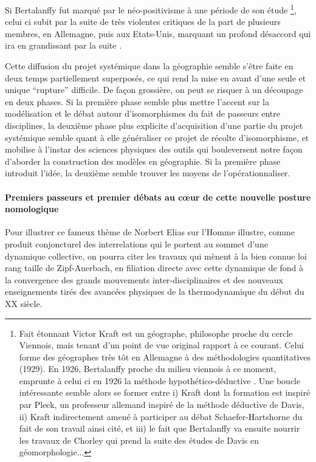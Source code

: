 Si Bertalanffy fut marqué par le néo-positivisme à une période de son étude \footnote{Fait étonnant Victor Kraft est un géographe, philosophe proche du cercle Viennois, mais tenant d'un point de vue original rapport à ce courant. Celui forme des géographes très tôt en Allemagne à des méthodologies quantitatives (1929). En 1926, Bertalanffy proche du milieu viennois à ce moment, emprunte à celui ci en 1926 la méthode hypothético-déductive \autocite[342]{Pouvreau2013}. Une boucle intéressante semble alors se former entre i) Kraft dont la formation est inspiré par Pleck, un professeur allemand inspiré de la méthode déductive de Davis, ii) Kraft indirectement amené à participer au débat Schaefer-Hartshorne du fait de son travail ainsi cité, et iii) le fait que Bertalanffy va ensuite nourrir les travaux de Chorley qui prend la suite des études de Davis en géomorphologie...}, celui ci subit par la suite de très violentes critiques de la part de plusieurs membres, en Allemagne, puis aux Etats-Unis, marquant un profond désaccord qui ira en grandissant par la suite \autocite[26-27]{Pouvreau2006}.

Cette diffusion du projet systémique dans la géographie semble s'être faite en deux temps partiellement superposés, ce qui rend la mise en avant d'une seule et unique \enquote{rupture} difficile. De façon grossière, on peut se risquer à un découpage en deux phases. Si la première phase semble plus mettre l'accent sur la modélisation et le débat autour d'isomorphismes du fait de passeurs entre disciplines, la deuxième phase plus explicite d'acquisition d'une partie du projet systémique semble quant à elle généraliser ce projet de récolte d'isomorphisme, et mobilise à l'instar des sciences physiques des outils qui bouleversent notre façon d'aborder la construction des modèles en géographie. Si la première phase introduit l'idée, la deuxième semble trouver les moyens de l’opérationnaliser.

\paragraph{Premiers passeurs et premier débats au cœur de cette nouvelle posture nomologique}

Pour illustrer ce fameux thème de Norbert Elias \autocite[31-33]{Delmotte2010} \textcite{Elias1991} sur l'Homme illustre, comme produit conjoncturel des interrelations qui le portent au sommet d'une dynamique collective, on pourra citer les travaux qui mènent à la bien connue loi rang taille de Zipf-Auerbach, en filiation directe avec cette dynamique de fond à la convergence des grands mouvements inter-disciplinaires et des nouveaux enseignements tirés des avancées physiques de la thermodynamique du début du XX siècle.

